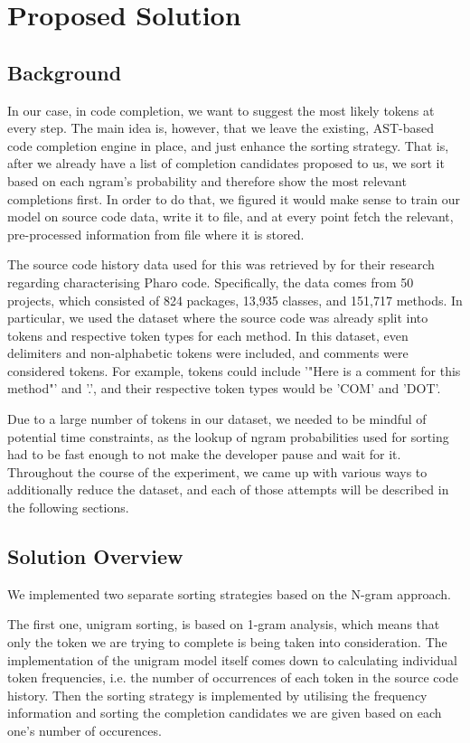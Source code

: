\chapter{Proposed Solution}
\label{chap:ProposedSolution}

\section{Background}
\label{sec:ProposedSolution-Background}
In our case, in code completion, we want to suggest the most likely tokens at every step. The main idea is, however, that we leave the existing, AST-based code completion engine in place, and just enhance the sorting strategy. That is, after we already have a list of completion candidates proposed to us, we sort it based on each ngram's probability and therefore show the most relevant completions first. In order to do that, we figured it would make sense to train our model on source code data, write it to file, and at every point fetch the relevant, pre-processed information from file where it is stored.

The source code history data used for this was retrieved by \cite{Zait20a} for their research regarding characterising Pharo code. Specifically, the data comes from 50 projects, which consisted of 824 packages, 13,935 classes, and 151,717 methods. In particular, we used the dataset where the source code was already split into tokens and respective token types for each method. In this dataset, even delimiters and non-alphabetic tokens were included, and comments were considered tokens. For example, tokens could include '"Here is a comment for this method"' and '.', and their respective token types would be 'COM' and 'DOT'.

Due to a large number of tokens in our dataset, we needed to be mindful of potential time constraints, as the lookup of ngram probabilities used for sorting had to be fast enough to not make the developer pause and wait for it. Throughout the course of the experiment, we came up with various ways to additionally reduce the dataset, and each of those attempts will be described in the following sections.

\section{Solution Overview}
\label{sec:ProposedSolution-Overview}
We implemented two separate sorting strategies based on the N-gram approach.

The first one, unigram sorting, is based on 1-gram analysis, which means that only the token we are trying to complete is being taken into consideration. The implementation of the unigram model itself comes down to calculating individual token frequencies, i.e. the number of occurrences of each token in the source code history. Then the sorting strategy is implemented by utilising the frequency information and sorting the completion candidates we are given based on each one's number of occurences.

